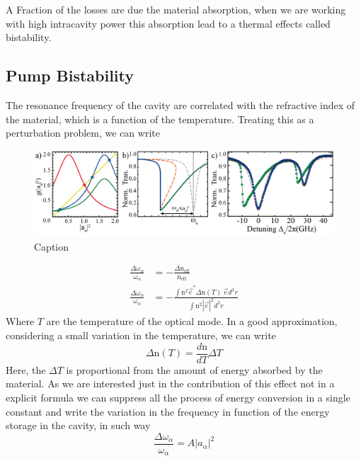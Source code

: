 A Fraction of the losses are due the material absorption, when we are working with high intracavity power this absorption lead to a thermal effects called bistability. 

\subsection{Pump Bistability}
The resonance frequency of the cavity are correlated with the refractive index of the material, which is a function of the temperature. Treating this as a perturbation problem, we can write \begin{figure}[b]
    \centering
    \includegraphics[width = 16cm]{Dissertation_bistabilite.jpg}
    \caption{Caption}
    \label{fig:bistable}
\end{figure}

\begin{subequations}
    \begin{alignat}{2}
        \frac{\Delta\omega_\alpha}{\omega_\alpha} &= -\frac{\Delta \text{n}_\text{eff}}{\text{n}_\text{eff}}\\
        \frac{\Delta\omega_\alpha}{\omega_\alpha} &= -\frac{\int \text{n}^2\vec{e}^*\Delta\text{n}(T)~\vec{e} d^3r}
        {\int \text{n}^2 |\vec{e}|^2 d^3r}
    \end{alignat}
\end{subequations}
Where $T$ are the temperature of the optical mode. In a good approximation, considering a small variation in the temperature, we can write
\begin{equation}
    \Delta \text{n}(T) = \frac{d\text{n}}{dT}\Delta T
\end{equation}
Here, the $\Delta T$ is proportional from the amount of energy absorbed by the material. As we are interested just in the contribution of this effect not in a explicit formula we can suppress all the process of energy conversion in a single constant and write the variation in the frequency in function of the energy storage in the cavity, in such way
\begin{equation}
\frac{\Delta \omega_\alpha}{\omega_\alpha} = A |a_\alpha|^2
\label{eq:pertubation_bistaliti_cavity}
\end{equation}   

